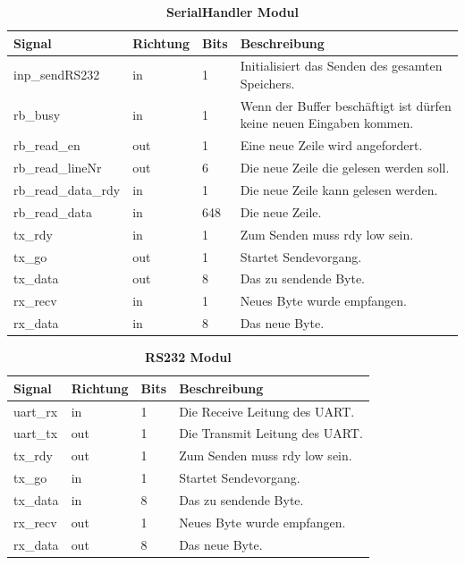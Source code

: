 
\begin{table}[!h]
\caption{\textbf{SerialHandler Modul}}
 \begin{center}
  \begin{tabular}{|p{4cm}|p{}|p{1cm}|p{9cm}|}
   \hline Signal & Richtung & Bits & Beschreibung\\
   \hline
   inp\_sendRS232 & in & 1 & Initialisiert das Senden des gesamten Speichers.\\
   rb\_busy & in & 1 & Wenn der Buffer beschäftigt ist dürfen keine neuen Eingaben kommen.\\
   rb\_read\_en & out & 1 & Eine neue Zeile wird angefordert.\\
   rb\_read\_lineNr & out & 6 & Die neue Zeile die gelesen werden soll.\\
   rb\_read\_data\_rdy & in & 1 & Die neue Zeile kann gelesen werden.\\
   rb\_read\_data & in & 648 & Die neue Zeile.\\
   tx\_rdy & in & 1 & Zum Senden muss rdy low sein.\\
   tx\_go & out & 1 & Startet Sendevorgang.\\
   tx\_data & out & 8 & Das zu sendende Byte.\\
   rx\_recv & in & 1 & Neues Byte wurde empfangen.\\
   rx\_data & in & 8 & Das neue Byte.\\
   \hline
  \end{tabular}
 \end{center} 
\end{table}



\begin{table}[!h]
 \caption{\textbf{RS232 Modul}}
 \begin{center}
  \begin{tabular}{|p{4cm}|p{}|p{1cm}|p{9cm}|}
   \hline Signal & Richtung & Bits & Beschreibung\\
   \hline
   uart\_rx & in & 1 & Die Receive Leitung des UART.\\
   uart\_tx & out & 1 & Die Transmit Leitung des UART.\\
   tx\_rdy & out & 1 & Zum Senden muss rdy low sein.\\
   tx\_go & in & 1 & Startet Sendevorgang.\\
   tx\_data & in & 8 & Das zu sendende Byte.\\
   rx\_recv & out & 1 & Neues Byte wurde empfangen.\\
   rx\_data & out & 8 & Das neue Byte.\\
   \hline
  \end{tabular}
 \end{center}
\end{table}


